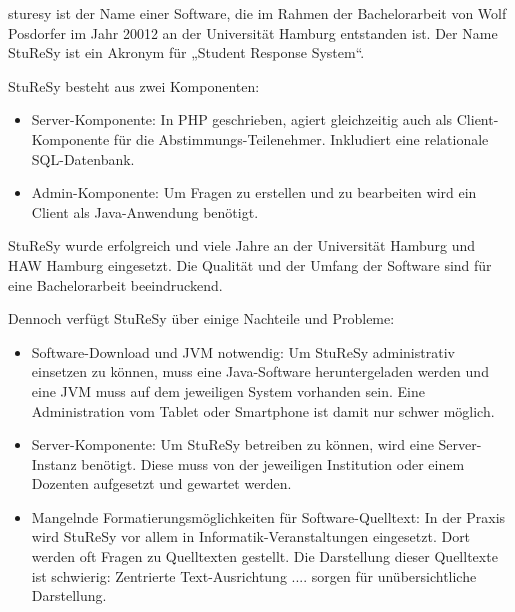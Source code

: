 \ac{sturesy} ist der Name einer Software, die im Rahmen der Bachelorarbeit von Wolf Posdorfer im Jahr 20012 an der Universität Hamburg entstanden ist. Der Name StuReSy ist ein Akronym für „Student Response System“.

StuReSy besteht aus zwei Komponenten:
\begin{itemize}
    \item Server-Komponente: In PHP geschrieben, agiert gleichzeitig auch als Client-Komponente für die Abstimmungs-Teilenehmer. Inkludiert eine relationale SQL-Datenbank.
    \item Admin-Komponente: Um Fragen zu erstellen und zu bearbeiten wird ein Client als Java-Anwendung benötigt.
\end{itemize}

StuReSy wurde erfolgreich und viele Jahre an der Universität Hamburg und HAW Hamburg eingesetzt. Die Qualität und der Umfang der Software sind für eine Bachelorarbeit beeindruckend.

Dennoch verfügt StuReSy über einige Nachteile und Probleme:
\begin{itemize}
    \item Software-Download und JVM notwendig: Um StuReSy administrativ einsetzen zu können, muss eine Java-Software heruntergeladen werden und eine JVM muss auf dem jeweiligen System vorhanden sein. Eine Administration vom Tablet oder Smartphone ist damit nur schwer möglich.
    \item Server-Komponente: Um StuReSy betreiben zu können, wird eine Server-Instanz benötigt. Diese muss von der jeweiligen Institution oder einem Dozenten aufgesetzt und gewartet werden.
    \item Mangelnde Formatierungsmöglichkeiten für Software-Quelltext: In der Praxis wird StuReSy vor allem in Informatik-Veranstaltungen eingesetzt. Dort werden oft Fragen zu Quelltexten gestellt. Die Darstellung dieser Quelltexte ist schwierig: Zentrierte Text-Ausrichtung .... sorgen für unübersichtliche Darstellung.
\end{itemize}
